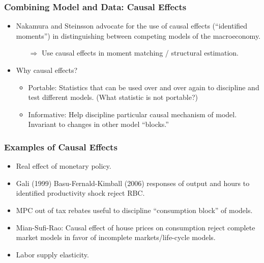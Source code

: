 \documentclass[english,xcolor=svgnames]{beamer}
\begin{document}
\begin{frame}
\frametitle[alignment=center]{Combining Model and Data: Causal Effects}
\begin{itemize}
	\item Nakamura and Steinsson advocate for the use of causal effects (``identified moments'') in distinguishing between competing models of the macroeconomy.
	\begin{itemize}
		\item[$\Rightarrow$] Use causal effects in moment matching / structural estimation.
	\end{itemize}
	\item Why causal effects?
	\begin{itemize}
		\item Portable: Statistics that can be used over and over again to discipline and test different models. (What statistic is not portable?)
		\item Informative: Help discipline particular causal mechanism of model. Invariant to changes in other model ``blocks.''
	\end{itemize}
\end{itemize}
\end{frame}


\begin{frame}
\frametitle[alignment=center]{Examples of Causal Effects}
\begin{itemize}
	\item Real effect of monetary policy.
	\item Gali (1999) Basu-Fernald-Kimball (2006) responses of output and hours to identified productivity shock reject RBC.
	\item MPC out of tax rebates useful to discipline ``consumption block'' of models.
	\item Mian-Sufi-Rao: Causal effect of house prices on consumption reject complete market models in favor of incomplete markets/life-cycle models.
	\item Labor supply elasticity.
\end{itemize}
\end{frame}
\end{document}
